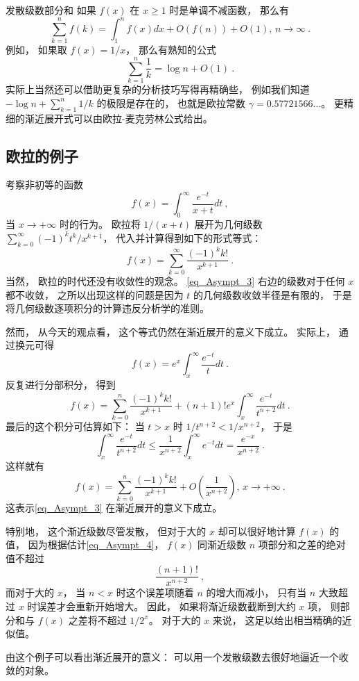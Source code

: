 \begin{example}{发散级数部分和}
如果 $f(x)$ 在 $x\geq1$ 时是单调不减函数， 那么有$$
\sum_{k=1}^nf(k)=\int_1^n f(x)dx+O(f(n))+O(1),\,n\to\infty~.
$$
例如， 如果取 $f(x)=1/x$， 那么有熟知的公式
$$
\sum_{k=1}^n\frac{1}{k}=\log n+O(1)~.
$$
实际上当然还可以借助更复杂的分析技巧写得再精确些， 例如我们知道 $-\log n+\sum_{k=1}^n1/k$ 的极限是存在的， 也就是欧拉常数 $\gamma=0.57721566...$。 更精细的渐近展开式可以由欧拉-麦克劳林公式给出。
\end{example}

\subsection{欧拉的例子}
考察非初等的函数
$$
f(x)=\int_0^\infty\frac{e^{-t}}{x+t}dt~,
$$
当 $x\to+\infty$ 时的行为。 欧拉将 $1/(x+t)$ 展开为几何级数
$\sum_{k=0}^\infty {(-1)^kt^k}/{x^{k+1}}$， 
代入并计算得到如下的形式等式：
\begin{equation}\label{eq_Asympt_3}
f(x)=\sum_{k=0}^\infty\frac{(-1)^kk!}{x^{k+1}}~.
\end{equation}
当然， 欧拉的时代还没有收敛性的观念。 \autoref{eq_Asympt_3} 右边的级数对于任何 $x$ 都不收敛， 之所以出现这样的问题是因为 $t$ 的几何级数收敛半径是有限的， 于是将几何级数逐项积分的计算违反分析学的准则。 

然而， 从今天的观点看， 这个等式仍然在渐近展开的意义下成立。 实际上， 通过换元可得
$$
f(x)=e^{x}\int_x^\infty \frac{e^{-t}}{t}dt~.
$$
反复进行分部积分， 得到
$$
f(x)=\sum_{k=0}^n\frac{(-1)^kk!}{x^{k+1}}
+(n+1)!e^x\int_x^\infty\frac{e^{-t}}{t^{n+2}}dt~.
$$
最后的这个积分可估算如下： 当 $t>x$ 时 $1/t^{n+2}<1/x^{n+2}$， 于是
\begin{equation}\label{eq_Asympt_4}
\int_x^\infty\frac{e^{-t}}{t^{n+2}}dt
\leq\frac{1}{x^{n+2}}\int_x^\infty e^{-t}dt
=\frac{e^{-x}}{x^{n+2}}~.
\end{equation}
这样就有
$$
f(x)=\sum_{k=0}^n\frac{(-1)^kk!}{x^{k+1}}
+O\left(\frac{1}{x^{n+2}}\right),\,x\to+\infty~.
$$
这表示\autoref{eq_Asympt_3} 在渐近展开的意义下成立。 

特别地， 这个渐近级数尽管发散， 但对于大的 $x$ 却可以很好地计算 $f(x)$ 的值， 因为根据估计\autoref{eq_Asympt_4}， $f(x)$ 同渐近级数 $n$ 项部分和之差的绝对值不超过
$$
\frac{(n+1)!}{x^{n+2}}~,
$$
而对于大的 $x$， 当 $n<x$ 时这个误差项随着 $n$ 的增大而减小， 只有当 $n$ 大致超过 $x$ 时误差才会重新开始增大。 因此， 如果将渐近级数截断到大约 $x$ 项， 则部分和与 $f(x)$ 之差将不超过 $1/2^x$。 对于大的 $x$ 来说， 这足以给出相当精确的近似值。 

由这个例子可以看出渐近展开的意义： 可以用一个发散级数去很好地逼近一个收敛的对象。